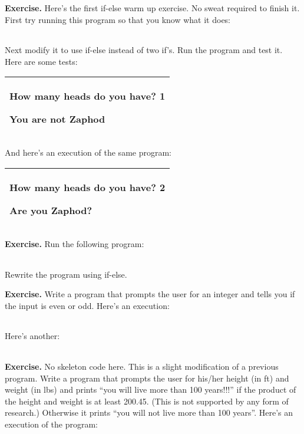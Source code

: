 \documentclass[
]{article}
\begin{document}
\textbf{Exercise.} Here's the first if-else warm up exercise. No sweat
required to finish it. First try running this program so that you know
what it does:

\begin{longtable}[]{@{}@{}}
\toprule
\endhead
\bottomrule
\end{longtable}

Next modify it to use if-else instead of two if's. Run the program and
test it. Here are some tests:

\begin{longtable}[]{@{}l@{}}
\toprule
\endhead
\begin{minipage}[t]{0.97\columnwidth}\raggedright
How many heads do you have? \textbf{1}

You are not Zaphod\strut
\end{minipage}\tabularnewline
\bottomrule
\end{longtable}

And here's an execution of the same program:

\begin{longtable}[]{@{}l@{}}
\toprule
\endhead
\begin{minipage}[t]{0.97\columnwidth}\raggedright
How many heads do you have? \textbf{2}

Are you Zaphod?\strut
\end{minipage}\tabularnewline
\bottomrule
\end{longtable}

\textbf{Exercise.} Run the following program:

\begin{longtable}[]{@{}@{}}
\toprule
\endhead
\bottomrule
\end{longtable}

Rewrite the program using if-else.

\textbf{Exercise.} Write a program that prompts the user for an integer
and tells you if the input is even or odd. Here's an execution:

\begin{longtable}[]{@{}@{}}
\toprule
\endhead
\bottomrule
\end{longtable}

Here's another:

\begin{longtable}[]{@{}@{}}
\toprule
\endhead
\bottomrule
\end{longtable}

\textbf{Exercise.} No skeleton code here. This is a slight modification
of a previous program. Write a program that prompts the user for his/her
height (in ft) and weight (in lbs) and prints ``you will live more than
100 years!!!'' if the product of the height and weight is at least
200.45. (This is not supported by any form of research.) Otherwise it
prints ``you will not live more than 100 years''. Here's an execution of
the program:
\end{document}
